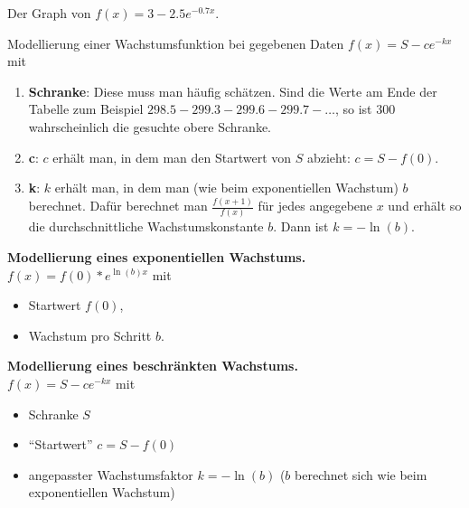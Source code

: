 \begin{marginfigure}
  \caption{Der Graph von $f(x)=3-2.5e^{-0.7x}$.}
\end{marginfigure}

\begin{bla}{Modellierung einer Wachstumsfunktion bei gegebenen Daten}
  $f(x)=S-ce^{-kx}$ mit
  \begin{enumerate}
    \item \textbf{Schranke}: Diese muss man häufig schätzen. Sind die Werte am Ende der Tabelle zum Beispiel $298.5 - 299.3 - 299.6 - 299.7 - \dots$, so ist $300$ wahrscheinlich die gesuchte obere Schranke.
    \item \textbf{c}: $c$ erhält man, in dem man den Startwert von $S$ abzieht: $c=S-f(0)$.
    \item \textbf{k}: $k$ erhält man, in dem man (wie beim exponentiellen Wachstum) $b$ berechnet. Dafür berechnet man $\frac{f(x+1)}{f(x)}$ für jedes angegebene $x$ und erhält so die durchschnittliche Wachstumskonstante $b$. Dann ist $k=-\ln(b)$.
  \end{enumerate}
\end{bla}

\begin{koch}
  \textbf{Modellierung eines exponentiellen Wachstums.} \\
  $f(x)=f(0)*e^{\ln(b)x}$ mit
  \begin{itemize}
    \item Startwert $f(0)$,
    \item Wachstum pro Schritt $b$.
  \end{itemize}
  \textbf{Modellierung eines beschränkten Wachstums.} \\
  \( f(x) = S - ce^{-kx} \) mit
  \begin{itemize}
    \item Schranke \( S \)
    \item ``Startwert'' \( c = S - f(0) \)
    \item angepasster Wachstumsfaktor \( k = -\ln(b) \) (\( b \) berechnet sich wie beim exponentiellen Wachstum)
  \end{itemize}
\end{koch}

